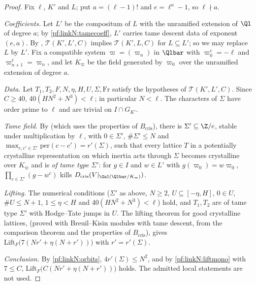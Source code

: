 \begin{proof}
Fix $\ell$, $K'$ and $L$; put $a=(\ell-1)!$ and $e=\ell^a-1$, so $\ell\nmid a$.

\emph{Coefficients.} Let $L'$ be the compositum of $L$ with the unramified extension of $\Ql$ of degree $a$; by \cref{pf:linkN:tamecoeff}, $L'$
carries tame descent data of exponent $(e,a)$. By , $\mathcal T(K',L',C)$ implies
$\mathcal T(K',L,C)$ for $L\subseteq L'$; so we may replace $L$ by $L'$. Fix a compatible system $\varpi=(\varpi_n)$ in $\Qlbar$ with $\varpi_0^e=-\ell$ and
$\varpi_{n+1}^\ell=\varpi_n$, and let $K_\varpi$ be the field generated by $\varpi_0$ over the unramified extension of degree $a$.

\emph{Data.} Let $T_1,T_2,F,N,\eta,H,U,\Sigma,\mathrm{Fr}$ satisfy the hypotheses of $\mathcal T(K',L',C)$. Since $C\ge40$,
$40(HN^2+N^3)<\ell$; in particular $N<\ell$. The characters of $\Sigma$ have order prime to $\ell$ and are trivial on $I\cap G_{K'}$.

\emph{Tame field.} By  (which uses the properties of
$B_{\mathrm{cris}}$), there is $\Sigma'\subseteq\Z/e$, stable under multiplication by $\ell$, with $0\in\Sigma'$, $\#\Sigma'\le N$ and
$\max_{c,c'\in\Sigma'}\mathrm{per}(c-c')=r'(\Sigma)$, such that every lattice $T$ in a potentially crystalline representation on which inertia acts
through $\Sigma$ becomes crystalline over $K_\varpi$ and is \emph{of tame type $\Sigma'$}: for $g\in I$ and $w\in L'$ with $g(\varpi_0)=w\varpi_0$,
$\prod_{c\in\Sigma'}(g-w^c)$ kills $D_{\mathrm{cris}}(V|_{\Gal(\Qlbar/K_\varpi)})$.

\emph{Lifting.} The numerical conditions ($\Sigma'$ as above, $N\ge2$, $U\subseteq[-\eta,H]$, $0\in U$, $\#U\le N+1$, $1\le\eta<H$ and
$40(HN^2+N^3)<\ell$) hold, and $T_1,T_2$ are of tame type $\Sigma'$ with Hodge--Tate jumps in $U$. The lifting theorem for good crystalline
lattices,  (proved with Breuil--Kisin modules with tame descent, from the
comparison theorem and the properties of $B_{\mathrm{cris}}$), gives $\mathrm{Lift}_F\bigl(7(Nr'+\eta(N+r'))\bigr)$ with $r'=r'(\Sigma)$.

\emph{Conclusion.} By \cref{pf:linkN:orbits}, $4r'(\Sigma)\le N^2$, and by \cref{pf:linkN:liftmono} with $7\le C$,
$\mathrm{Lift}_F\bigl(C(Nr'+\eta(N+r'))\bigr)$ holds. The admitted local statements are not used.
\end{proof}

